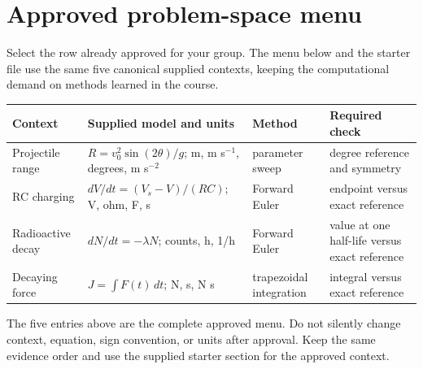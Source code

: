 \documentclass[11pt,a4paper]{article}
\begin{document}
\section*{Approved problem-space menu}
Select the row already approved for your group. The menu below and the starter file use the same five canonical supplied contexts, keeping the computational demand on methods learned in the course.
\begin{center}\small
\begin{tabular}{>{\raggedright\arraybackslash}p{.16\linewidth}>{\raggedright\arraybackslash}p{.26\linewidth}>{\raggedright\arraybackslash}p{.20\linewidth}>{\raggedright\arraybackslash}p{.23\linewidth}}
\toprule
\textbf{Context} & \textbf{Supplied model and units} & \textbf{Method} & \textbf{Required check} \\ \midrule
Projectile range & $R=v_0^2\sin(2\theta)/g$; m, m s$^{-1}$, degrees, m s$^{-2}$ & parameter sweep & 45 degree reference and symmetry \\
RC charging & $dV/dt=(V_s-V)/(RC)$; V, ohm, F, s & Forward Euler & endpoint versus exact reference \\
Radioactive decay & $dN/dt=-\lambda N$; counts, h, 1/h & Forward Euler & value at one half-life versus exact reference \\
Decaying force & $J=\int F(t)\,dt$; N, s, N s & trapezoidal integration & integral versus exact reference \\
\bottomrule
\end{tabular}
\end{center}
The five entries above are the complete approved menu. Do not silently change context, equation, sign convention, or units after approval. Keep the same evidence order and use the supplied starter section for the approved context.
\end{document}
